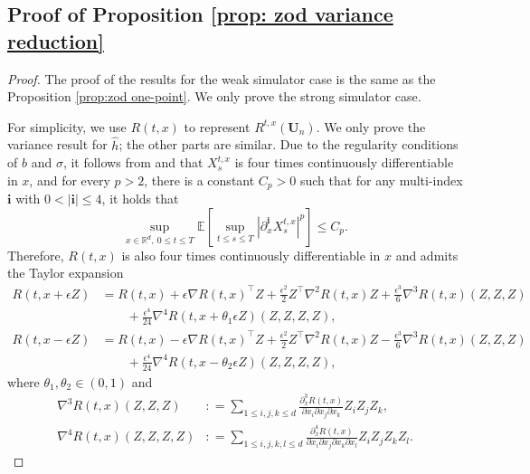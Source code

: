 \documentclass[twoside,11pt]{article}
\newcommand{\bm}[1]{\boldsymbol{#1}}
\newcommand{\E}{\mathbb{E}}
\newcommand{\R}{\mathbb{R}}
\newcommand{\1}{\mathbf{1}}
\numberwithin{equation}{section}
\begin{document}
\subsection{Proof of Proposition \ref{prop: zod variance reduction}}
 \begin{proof}
    The proof of the results for the weak simulator case is the same as the Proposition \ref{prop:zod one-point}. We only prove the strong simulator case.

     For simplicity, we use $ R(t,x)$ to represent $ R^{t,x}(\mathbf{U}_n)$. We only prove the variance result for $ \hat h$; the other parts are similar.  Due to the regularity conditions of $ b$ and $ \sigma$, it follows from \citet[Theorem 40]{protter2005Stochastic} and \citet[Theorem 3.4.2]{kunita2019Stochastic} that $ X_s^{t,x}$ is four times continuously differentiable in $ x$, and for every $ p>2$, there is a constant $ C_p>0$ such that for any multi-index $ \bm i$ with $ 0<|\bm i|\le 4$, it holds that
     \begin{equation}\label{eq: bounded moments of derivatives}
         \sup_{x\in\R^d,\ 0\le t\le T}\E\left[ \sup_{t\le s\le T}|\partial^{\bm i}_x X_s^{t,x}|^p\right] \le C_p.
     \end{equation}
     Therefore, $ R(t,x)$ is also four  times continuously differentiable in $x$ and admits the Taylor expansion
     \begin{equation}
     \begin{aligned}
         R(t,x+\epsilon Z) &= R(t,x) + \epsilon \nabla R(t,x)^{\top}Z + \frac{\epsilon^2}{2}Z^{\top}\nabla^2R(t,x)Z + \frac{\epsilon^3}{6} \nabla^3 R(t,x)(Z,Z,Z) \\
         &\qquad+ \frac{\epsilon^4}{24} \nabla^4R(t,x+\theta_1 \epsilon Z)(Z,Z,Z,Z),\\
         R(t,x-\epsilon Z) &= R(t,x) - \epsilon \nabla R(t,x)^{\top}Z + \frac{\epsilon^2}{2}Z^{\top}\nabla^2R(t,x)Z - \frac{\epsilon^3}{6} \nabla^3 R(t,x)(Z,Z,Z) \\
         &\qquad+ \frac{\epsilon^4}{24} \nabla^4R(t,x-\theta_2 \epsilon Z)(Z,Z,Z,Z),
         \end{aligned}
     \end{equation}
     where $ \theta_1,\theta_2 \in (0,1)$ and
     \begin{equation}
     \begin{aligned}
         \nabla^3R(t,x)(Z,Z,Z)&: = \sum_{1\le i,j,k\le d} \frac{\partial^3_x R(t,x)}{\partial x_i\partial x_j \partial x_k}Z_iZ_jZ_k,\\
         \nabla^4R(t,x)(Z,Z,Z,Z)&: = \sum_{1\le i,j,k,l\le d}\frac{\partial^4_x R(t,x)}{\partial x_i\partial x_j \partial x_k \partial x_l}Z_iZ_jZ_kZ_l.

\end{aligned}
\end{equation}
\end{proof}
\end{document}
